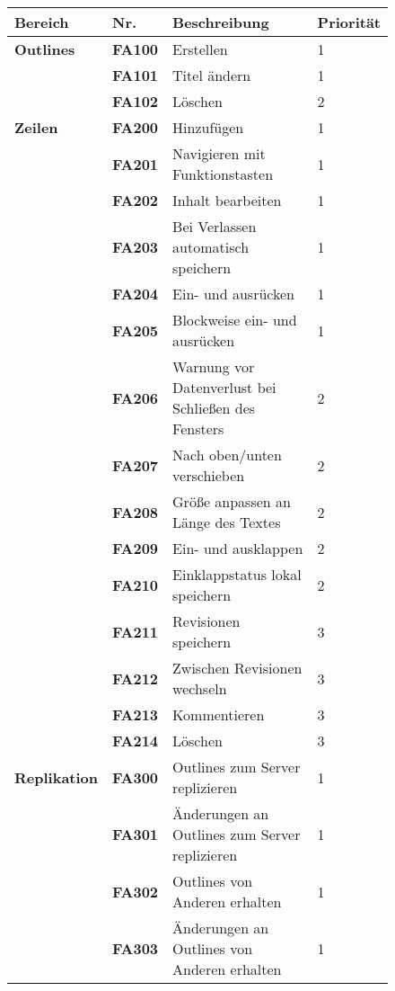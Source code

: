 \medskip
\begin{figure}[H]
  \begin{tabular}{ | l | l | l | l |}
    \hline
    \textbf{Bereich} & \textbf{Nr.} & \textbf{Beschreibung} & \textbf{Priorität}\\ \hline
    \hline
    \textbf{Outlines} & \textbf{FA100} & Erstellen & 1\\ \hline
    & \textbf{FA101} & Titel ändern & 1\\ \hline
    & \textbf{FA102} & Löschen & 2\\ \hline
    \hline
    \textbf{Zeilen} & \textbf{FA200} & Hinzufügen & 1\\ \hline
    & \textbf{FA201} & Navigieren mit Funktionstasten & 1\\ \hline
    & \textbf{FA202} & Inhalt bearbeiten & 1\\ \hline
    & \textbf{FA203} & Bei Verlassen automatisch speichern & 1\\ \hline
    & \textbf{FA204} & Ein- und ausrücken & 1\\ \hline
    & \textbf{FA205} & Blockweise ein- und ausrücken & 1\\ \hline
    & \textbf{FA206} & Warnung vor Datenverlust bei Schließen des Fensters & 2\\ \hline
    & \textbf{FA207} & Nach oben/unten verschieben & 2\\ \hline
    & \textbf{FA208} & Größe anpassen an Länge des Textes  & 2\\ \hline
    & \textbf{FA209} & Ein- und ausklappen  & 2\\ \hline
    & \textbf{FA210} & Einklappstatus lokal speichern  & 2\\ \hline
    & \textbf{FA211} & Revisionen speichern  & 3\\ \hline
    & \textbf{FA212} & Zwischen Revisionen wechseln  & 3\\ \hline
    & \textbf{FA213} & Kommentieren & 3\\ \hline
    & \textbf{FA214} & Löschen & 3\\ \hline
    \hline
    \textbf{Replikation} & \textbf{FA300} & Outlines zum Server replizieren & 1\\ \hline
    & \textbf{FA301} & Änderungen an Outlines zum Server replizieren & 1\\ \hline
    & \textbf{FA302} & Outlines von Anderen erhalten & 1\\ \hline
    & \textbf{FA303} & Änderungen an Outlines von Anderen erhalten & 1\\ \hline

\end{tabular}
\end{figure}

